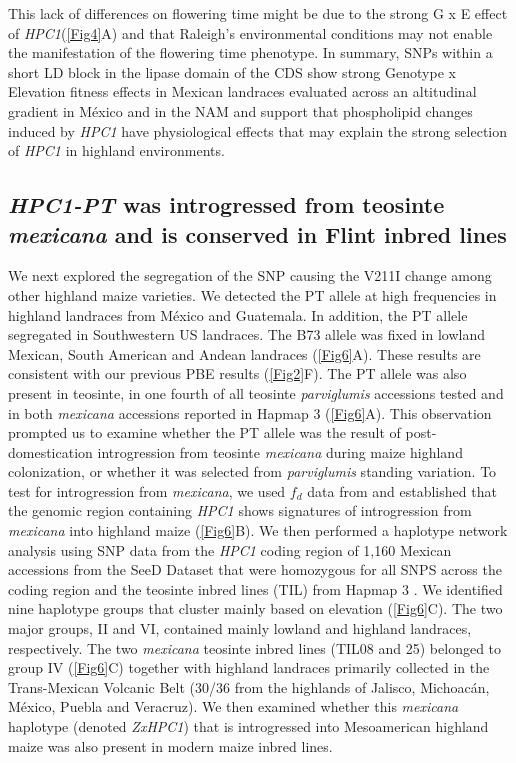 \documentclass[9pt,twocolumn,twoside,lineno]{biorxiv}
\newcommand{\mex}{\textit{mexicana}\xspace}
\newcommand{\hpc}{\textit{HPC1}\xspace}
\newcommand{\parv}{\textit{parviglumis}\xspace}
\begin{document}
This lack of differences on flowering time might be due to the strong G x E effect of \hpc (\cref{Fig4}A) and that Raleigh's environmental conditions may not enable the manifestation of the flowering time phenotype.
In summary, SNPs within a short LD block in the lipase domain of the  CDS show strong Genotype x Elevation fitness effects in Mexican landraces evaluated across an altitudinal gradient in M\'exico and in the NAM and support that phospholipid changes induced by \hpc have physiological effects that may explain the strong selection of \hpc in highland environments.
\subsection{\textit{HPC1-PT} was introgressed from teosinte \mex and is conserved in Flint inbred lines}
We next explored the segregation of the SNP causing the V211I change among other highland maize varieties.
We detected the PT allele at high frequencies in highland landraces from M\'exico and Guatemala. 
In addition, the PT allele segregated in Southwestern US landraces. 
The B73 allele was fixed in lowland Mexican, South American and Andean landraces (\cref{Fig6}A). 
These results are consistent with our previous PBE results (\cref{Fig2}F).
The PT allele was also present in teosinte, in one fourth of all teosinte \parv accessions tested and in both \mex accessions reported in Hapmap 3 \cite{Bukowski2017-ng} (\cref{Fig6}A). 
This observation prompted us to examine whether the PT allele was the result of post-domestication introgression from teosinte \mex during maize highland colonization, or whether it was selected from \parv standing variation.
To test for introgression from \mex, we used \(f_d\) data from \cite{Gonzalez-Segovia2019-jy} and established that the genomic region containing \hpc shows signatures of introgression from \mex into highland maize (\cref{Fig6}B).
We then performed a haplotype network analysis using SNP data from the \hpc coding region of 1,160 Mexican accessions from the SeeD Dataset \cite{Romero_Navarro2017-cn} that were homozygous for all SNPS across the coding region and the teosinte inbred lines (TIL) from Hapmap 3 \cite{Bukowski2017-ng}.   
We identified nine haplotype groups that cluster mainly based on elevation (\cref{Fig6}C). 
The two major groups, II and VI, contained mainly lowland and highland landraces, respectively. 
The two \mex teosinte inbred lines (TIL08 and 25) belonged to group IV  (\cref{Fig6}C) together with highland landraces primarily collected in the Trans-Mexican Volcanic Belt (30/36 from the highlands of Jalisco, Michoacán, M\'exico, Puebla and Veracruz).
We then examined whether this \mex haplotype (denoted \textit{ZxHPC1}) that is introgressed into Mesoamerican highland maize was also present in modern maize inbred lines. 
\end{document}
